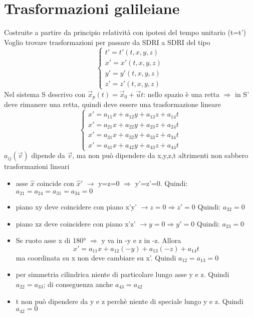 \section{Trasformazioni galileiane}

Costruite a partire da principio relatività con ipotesi del tempo unitario (t=t') \newline
Voglio trovare trasformazioni per passare da SDRI a SDRI del tipo
\begin{equation*}
    \begin{cases}
        t' = t'(t,x,y,z) \\
        x' = x'(t,x,y,z) \\
        y' = y'(t,x,y,z) \\
        z' = z'(t,x,y,z)
    \end{cases}
\end{equation*}
Nel sistema S descrivo con $\vec{x}_p(t) = \vec{x}_0 + \vec{u}t$: nello spazio è una retta $\Rightarrow$ in S' deve rimanere una retta, quindi deve essere una trasformazione lineare
\begin{equation*}
    \begin{cases}
        x' = a_{11}x +  a_{12}y +  a_{13}z +  a_{14}t \\
        x' = a_{21}x +  a_{22}y +  a_{23}z +  a_{24}t \\
        x' = a_{31}x +  a_{32}y +  a_{33}z +  a_{34}t \\
        x' = a_{41}x +  a_{42}y +  a_{43}z +  a_{44}t 
    \end{cases}
\end{equation*}
$a_{ij}(\vec{v})$ dipende da $\vec{v}$, ma non può dipendere da x,y,z,t altrimenti non sabbero trasformazioni lineari
\begin{itemize}
    \item asse $\hat{x}$ coincide con $\hat{x}'$ $\rightarrow$ y=z=0 $\Rightarrow$ y'=z'=0. Quindi: $a_{21}=a_{24}=a_{31}=a_{34}=0$
    \item piano xy deve coincidere con piano x'y' $\rightarrow z=0 \Rightarrow z'=0 $ Quindi: $a_{32}=0$
    \item piano xz deve coincidere con piano x'z' $\rightarrow y=0 \Rightarrow y'=0 $ Quindi: $a_{23}=0$
    \item Se ruoto asse x di 180° $\Rightarrow$ y va in -y e z in -z. Allora
    \begin{equation*}
        x' = a_{11}x +  a_{12}(-y)+  a_{13}(-z) +  a_{14}t
    \end{equation*}
    ma coordinata su x non deve cambiare su x'. Quindi $a_{12}=a_{13}=0$
    \item per simmetria cilindrica niente di particolare lungo asse y e z. Quindi $a_{22}=a_{33}$; di conseguenza anche $a_{43}=a_{42}$
    \item t non può dipendere da y e z perchè niente di speciale lungo y e z. Quindi $a_{42}=0$
\end{itemize}
